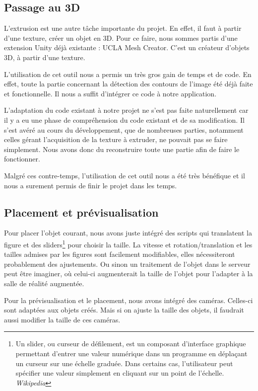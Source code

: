 \documentclass[a4paper,11pt]{article}
\begin{document}
		\hypertarget{ancre}{
		\subsection{Passage au 3D}} %
		\label{extrusion}
			L'extrusion est une autre tâche importante du projet. En effet, il faut à partir d'une texture, créer un objet en 3D. Pour ce faire, nous sommes partis d'une extension Unity déjà existante : UCLA Mesh Creator. C'est un créateur d'objets 3D, à partir d'une texture.
			
			L'utilisation de cet outil nous a permis un très gros gain de temps et de code. En effet, toute la partie concernant la détection des contours de l'image été déjà faite et fonctionnelle. Il nous a suffit d'intégrer ce code à notre application.
			
			L'adaptation du code existant à notre projet ne s'est pas faite naturellement car il y a eu une phase de compréhension du code existant et de sa modification. Il s'est avéré au cours du développement, que de nombreuses parties, notamment celles gérant l'acquisition de la texture à extruder, ne pouvait pas se faire simplement. Nous avons donc du reconstruire toute une partie afin de faire le fonctionner.
			
			Malgré ces contre-temps, l'utilisation de cet outil nous a été très bénéfique et il nous a surement permis de finir le projet dans les temps.
		\subsection{Placement et prévisualisation} %
		
			Pour placer l'objet courant, nous avons juste intégré des scripts qui translatent la figure et des sliders\footnote{Un slider, ou curseur de défilement, est un composant d'interface graphique permettant d'entrer une valeur numérique dans un programme en déplaçant un curseur sur une échelle graduée. Dans certains cas, l'utilisateur peut spécifier une valeur simplement en cliquant sur un point de l’échelle. \emph{Wikipedia}} pour choisir la taille. La vitesse et rotation/translation et les tailles admises par les figures sont facilement modifiables, elles nécessiteront probablement des ajustements. Ou sinon un traitement de l'objet dans le serveur peut être imaginer, où celui-ci augmenterait la taille de l'objet pour l'adapter à la salle de réalité augmentée.
			
			Pour la prévisualisation et le placement, nous avons intégré des caméras. Celles-ci sont adaptées aux objets créés. Mais si on ajuste la taille des objets, il faudrait aussi modifier la taille de ces caméras.
\end{document}
